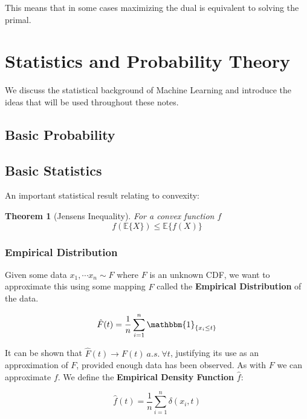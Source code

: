 \documentclass[]{article}
\theoremstyle{mattstyle}
\newtheorem{theorem}{Theorem}[section]
\theoremstyle{definition}
\begin{document}
This means that in some cases maximizing the dual is equivalent to solving the primal.

\newpage

\section{Statistics and Probability Theory}

We discuss the statistical background of Machine Learning and introduce the ideas that will be used throughout these notes.

\subsection{Basic Probability}

\subsection{Basic Statistics}

An important statistical result relating to convexity:

\begin{theorem}[Jensens Inequality]
	For a convex function $f$ $$f(\mathbb{E}\{X\})\le\mathbb{E}\{f(X)\}$$
\end{theorem}

\subsubsection{Empirical Distribution}\label{sec:empdist}

Given some data \(x_1, \cdots x_n \sim F\) where $F$ is an unknown CDF, we want to approximate this using some mapping $\hat{F}$ called the \textbf{Empirical Distribution} of the data.

\begin{equation}
	\hat{F}(t) = \frac{1}{n}\sum_{i=1}^n \mathbbm{1}_{\{x_i \le t\}}
\end{equation} 

It can be shown that $\hat{F}(t) \rightarrow F(t) \ a.s.\ \forall t$, justifying its use as an approximation of $F$, provided enough data has been observed. As with $F$ we can approximate $f$. We define the \textbf{Empirical Density Function} $\hat{f}$:

\begin{equation}
	\hat{f}(t) = \frac{1}{n}\sum_{i=1}^n \delta(x_i, t)
\end{equation}
\end{document}

